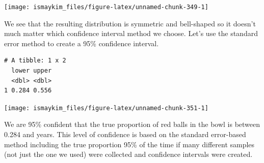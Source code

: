 \documentclass[12pt,]{krantz}
\makeatletter
\newenvironment{Shaded}{\begin{snugshade}}{\end{snugshade}}
\newcommand{\KeywordTok}[1]{\textcolor[rgb]{0.27,0.27,0.27}{\textbf{#1}}}
\newcommand{\DataTypeTok}[1]{\textcolor[rgb]{0.27,0.27,0.27}{#1}}
\newcommand{\DecValTok}[1]{\textcolor[rgb]{0.06,0.06,0.06}{#1}}
\newcommand{\FloatTok}[1]{\textcolor[rgb]{0.06,0.06,0.06}{#1}}
\newcommand{\StringTok}[1]{\textcolor[rgb]{0.5,0.5,0.5}{#1}}
\newcommand{\OperatorTok}[1]{\textcolor[rgb]{0.43,0.43,0.43}{\textbf{#1}}}
\newcommand{\NormalTok}[1]{#1}
\newenvironment{kframe}{%
\medskip{}
\setlength{\fboxsep}{.8em}
 \def\at@end@of@kframe{}%
 \ifinner\ifhmode%
  \def\at@end@of@kframe{\end{minipage}}%
  \begin{minipage}{\columnwidth}%
 \fi\fi%
 \def\FrameCommand##1{\hskip\@totalleftmargin \hskip-\fboxsep
 \colorbox{shadecolor}{##1}\hskip-\fboxsep
     \hskip-\linewidth \hskip-\@totalleftmargin \hskip\columnwidth}%
 \MakeFramed {\advance\hsize-\width
   \@totalleftmargin\z@ \linewidth\hsize
   \@setminipage}}%
 {\par\unskip\endMakeFramed%
 \at@end@of@kframe}
\renewenvironment{Shaded}{\begin{kframe}}{\end{kframe}}
\makeatother
\begin{document}
\begin{Shaded}
\end{Shaded}

\begin{center}\texttt{[image: ismaykim\_files/figure-latex/unnamed-chunk-349-1]} \end{center}

We see that the resulting distribution is symmetric and bell-shaped so
it doesn't much matter which confidence interval method we choose. Let's
use the standard error method to create a 95\% confidence interval.

\begin{Shaded}
\end{Shaded}

\begin{verbatim}
# A tibble: 1 x 2
  lower upper
  <dbl> <dbl>
1 0.284 0.556
\end{verbatim}

\begin{Shaded}
\end{Shaded}

\begin{center}\texttt{[image: ismaykim\_files/figure-latex/unnamed-chunk-351-1]} \end{center}

We are 95\% confident that the true proportion of red balls in the bowl
is between 0.284 and years. This level of confidence is based on the
standard error-based method including the true proportion 95\% of the
time if many different samples (not just the one we used) were collected
and confidence intervals were created.
\end{document}
